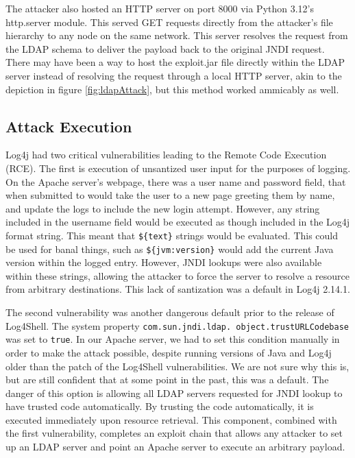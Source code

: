 \documentclass[sigconf]{acmart}
\begin{document}
The attacker also hosted an HTTP server on port 8000 via Python 3.12's http.server module. This served GET requests directly
from the attacker's file hierarchy to any node on the same network. This server resolves the request from the 
LDAP schema to deliver the payload back to the original JNDI request. There may have been a way to host the exploit.jar file
directly within the LDAP server instead of resolving the request through a local HTTP server, akin to the depiction in figure \ref{fig:ldapAttack}, 
but this method worked ammicably as well. 

\subsection{Attack Execution}

Log4j had two critical vulnerabilities leading to the Remote Code Execution (RCE). The first is execution of unsantized user input
for the purposes of logging. On the Apache server's webpage, there was a user name and password field, that when submitted to
would take the user to a new page greeting them by name, and update the logs to include the new login attempt. However, any 
string included in the username field would be executed as though included in the Log4j format string. This meant that 
\texttt{\$\{text\}} strings would be evaluated. This could be used for banal things, such as \texttt{\$\{jvm:version\}} would 
add the current Java version within the logged entry. However, JNDI lookups were also available within these strings, allowing the 
attacker to force the server to resolve a resource from arbitrary destinations. This lack of santization was a default 
in Log4j 2.14.1.

The second vulnerability was another dangerous default prior to the release of Log4Shell. The system property
\texttt{com.sun.jndi.ldap.
object.trustURLCodebase} was set to \texttt{true}. In our Apache server, we had to set this 
condition manually in order to make the attack possible, despite running versions of Java and Log4j older than the patch
of the Log4Shell vulnerabilities. We are not sure why this is, but are still confident that at some point in the past,
this was a default. The danger of this option is allowing all LDAP servers requested for JNDI lookup to have trusted code 
automatically. By trusting the code automatically, it is executed immediately upon resource retrieval. This component, combined 
with the first vulnerability, completes an exploit chain that allows any attacker to set up an LDAP server and point
an Apache server to execute an arbitrary payload.   
\end{document}
